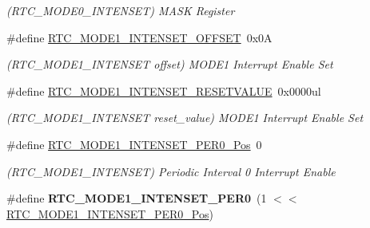 \begin{DoxyCompactItemize}
\begin{DoxyCompactList}\small\item\em (R\+T\+C\+\_\+\+M\+O\+D\+E0\+\_\+\+I\+N\+T\+E\+N\+S\+E\+T) M\+A\+S\+K Register \end{DoxyCompactList}\item 
\hypertarget{group___s_a_m_l21___r_t_c_gaed5110e9e19b906c47fa16d94efd56b4}{}\#define \hyperlink{group___s_a_m_l21___r_t_c_gaed5110e9e19b906c47fa16d94efd56b4}{R\+T\+C\+\_\+\+M\+O\+D\+E1\+\_\+\+I\+N\+T\+E\+N\+S\+E\+T\+\_\+\+O\+F\+F\+S\+E\+T}~0x0\+A\label{group___s_a_m_l21___r_t_c_gaed5110e9e19b906c47fa16d94efd56b4}

\begin{DoxyCompactList}\small\item\em (R\+T\+C\+\_\+\+M\+O\+D\+E1\+\_\+\+I\+N\+T\+E\+N\+S\+E\+T offset) M\+O\+D\+E1 Interrupt Enable Set \end{DoxyCompactList}\item 
\hypertarget{group___s_a_m_l21___r_t_c_gaf114822c7d936c0fcc5fc9e2297c1a36}{}\#define \hyperlink{group___s_a_m_l21___r_t_c_gaf114822c7d936c0fcc5fc9e2297c1a36}{R\+T\+C\+\_\+\+M\+O\+D\+E1\+\_\+\+I\+N\+T\+E\+N\+S\+E\+T\+\_\+\+R\+E\+S\+E\+T\+V\+A\+L\+U\+E}~0x0000ul\label{group___s_a_m_l21___r_t_c_gaf114822c7d936c0fcc5fc9e2297c1a36}

\begin{DoxyCompactList}\small\item\em (R\+T\+C\+\_\+\+M\+O\+D\+E1\+\_\+\+I\+N\+T\+E\+N\+S\+E\+T reset\+\_\+value) M\+O\+D\+E1 Interrupt Enable Set \end{DoxyCompactList}\item 
\hypertarget{group___s_a_m_l21___r_t_c_ga2375196d77bd746d2a5ec47791966fc7}{}\#define \hyperlink{group___s_a_m_l21___r_t_c_ga2375196d77bd746d2a5ec47791966fc7}{R\+T\+C\+\_\+\+M\+O\+D\+E1\+\_\+\+I\+N\+T\+E\+N\+S\+E\+T\+\_\+\+P\+E\+R0\+\_\+\+Pos}~0\label{group___s_a_m_l21___r_t_c_ga2375196d77bd746d2a5ec47791966fc7}

\begin{DoxyCompactList}\small\item\em (R\+T\+C\+\_\+\+M\+O\+D\+E1\+\_\+\+I\+N\+T\+E\+N\+S\+E\+T) Periodic Interval 0 Interrupt Enable \end{DoxyCompactList}\item 
\hypertarget{group___s_a_m_l21___r_t_c_ga822b916572e37fd219a4a4bbfcf619f1}{}\#define {\bfseries R\+T\+C\+\_\+\+M\+O\+D\+E1\+\_\+\+I\+N\+T\+E\+N\+S\+E\+T\+\_\+\+P\+E\+R0}~(1 $<$$<$ \hyperlink{group___s_a_m_l21___r_t_c_ga2375196d77bd746d2a5ec47791966fc7}{R\+T\+C\+\_\+\+M\+O\+D\+E1\+\_\+\+I\+N\+T\+E\+N\+S\+E\+T\+\_\+\+P\+E\+R0\+\_\+\+Pos})\label{group___s_a_m_l21___r_t_c_ga822b916572e37fd219a4a4bbfcf619f1}


\end{DoxyCompactItemize}
